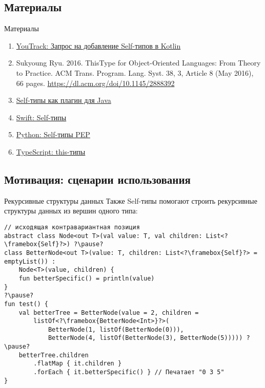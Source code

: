 \documentclass[aspectratio=169,usenames,dvipsnames]{beamer}
\begin{document}
    \subsection{Материалы}

    \begin{frame}{Материалы}
        \begin{enumerate}
            \item \href{https://youtrack.jetbrains.com/issue/KT-6494}{\color{blue} YouTrack: Запрос на добавление Self-типов в Kotlin}
            \item Sukyoung Ryu. 2016. ThisType for Object-Oriented Languages: From Theory to Practice. ACM Trans. Program. Lang. Syst. 38, 3, Article 8 (May 2016), 66 pages. {\color{blue}\url{https://dl.acm.org/doi/10.1145/2888392}}
            \item \href{https://github.com/manifold-systems/manifold/blob/master/manifold-deps-parent/manifold-ext/README.md#the-self-type-with-self}{\color{blue} Self-типы как плагин для Java}
            \item \href{https://docs.swift.org/swift-book/documentation/the-swift-programming-language/types/\#Self-Type}{\color{blue} Swift: Self-типы}
            \item \href{https://peps.python.org/pep-0673/}{\color{blue} Python: Self-типы PEP}
            \item \href{https://www.typescriptlang.org/docs/handbook/2/classes.html\#this-types}{\color{blue}TypeScript: this-типы}
        \end{enumerate}
    \end{frame}

    \subsection{Мотивация: сценарии использования}

    \begin{frame}[fragile]{Рекурсивные структуры данных}
        Также Self-типы помогают строить рекурсивные структуры данных из вершин одного типа:
        \begin{verbatim}
// исходящая контравариантная позиция
abstract class Node<out T>(val value: T, val children: List<?\framebox{Self}?>) ?\pause?
class BetterNode<out T>(value: T, children: List<?\framebox{Self}?> = emptyList()) :
    Node<T>(value, children) {
    fun betterSpecific() = println(value)
}
?\pause?
fun test() {
    val betterTree = BetterNode(value = 2, children =
        listOf<?\framebox{BetterNode<Int>}?>(
            BetterNode(1, listOf(BetterNode(0))),
            BetterNode(4, listOf(BetterNode(3), BetterNode(5))))) ?\pause?
    betterTree.children
        .flatMap { it.children }
        .forEach { it.betterSpecific() } // Печатает "0 3 5"
}
        \end{verbatim}
    \end{frame}
\end{document}
